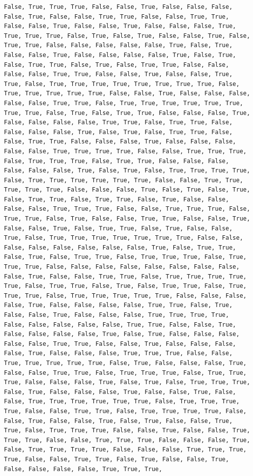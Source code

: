 \documentclass[
  letterpaper,
  DIV=11,
  numbers=noendperiod]{scrartcl}
\begin{document}
\begin{verbatim}
False, True, True, True, False, False, True, False, False, False, False, True, False, False, True, True, False, False, True, True, False, False, True, False, False, True, False, False, False, True, True, True, True, False, True, False, True, False, False, True, False, True, True, False, False, False, False, False, True, False, True, False, False, True, False, False, False, False, True, False, True, False, True, True, False, True, False, True, True, False, False, False, False, True, True, False, False, True, False, False, True, True, False, True, True, True, True, True, True, True, True, False, True, True, True, True, True, False, False, True, False, False, False, False, False, True, True, False, True, True, True, True, True, True, True, True, False, True, False, True, True, False, False, False, True, False, False, False, False, True, True, False, True, True, False, False, False, False, True, False, True, False, True, True, False, False, True, True, False, False, False, True, False, False, False, False, False, True, True, True, True, False, False, True, True, True, False, True, True, True, False, True, True, False, False, False, False, False, False, True, False, True, False, True, True, True, True, False, True, True, True, True, True, True, False, False, True, True, True, True, True, False, False, False, True, False, True, False, True, False, True, True, False, True, True, False, True, False, False, False, False, True, True, True, False, False, True, True, True, False, True, True, False, True, False, False, True, True, False, False, True, False, False, True, False, True, True, False, True, False, False, True, False, True, True, True, True, True, True, True, False, False, False, False, False, False, False, False, True, False, True, True, False, True, False, True, True, False, True, True, True, False, True, True, True, False, False, False, False, False, False, False, False, False, True, False, False, True, True, False, True, True, True, True, True, False, True, True, False, True, False, True, True, False, True, True, True, False, True, True, True, True, True, False, False, False, False, True, False, False, False, False, True, True, False, True, False, False, True, False, False, False, True, True, True, True, False, False, False, False, False, True, True, False, False, True, False, False, False, False, True, False, True, False, False, False, False, False, True, True, False, False, True, False, False, False, False, True, False, False, False, True, True, True, False, False, True, True, True, True, True, False, True, False, False, False, True, False, False, True, True, False, True, True, True, False, True, True, True, False, False, False, True, False, True, False, True, True, True, False, True, False, False, False, True, False, False, True, False, False, True, True, True, True, True, True, False, True, True, True, True, False, False, True, True, False, True, True, True, True, False, False, True, False, False, True, False, True, False, False, True, True, False, True, True, True, False, False, True, False, False, True, True, True, False, False, True, True, True, False, False, False, True, False, True, True, True, True, False, False, False, True, True, True, True, False, False, True, True, False, True, False, False, True, False, False, False, False, True, True, True, 
\end{verbatim}
\end{document}

